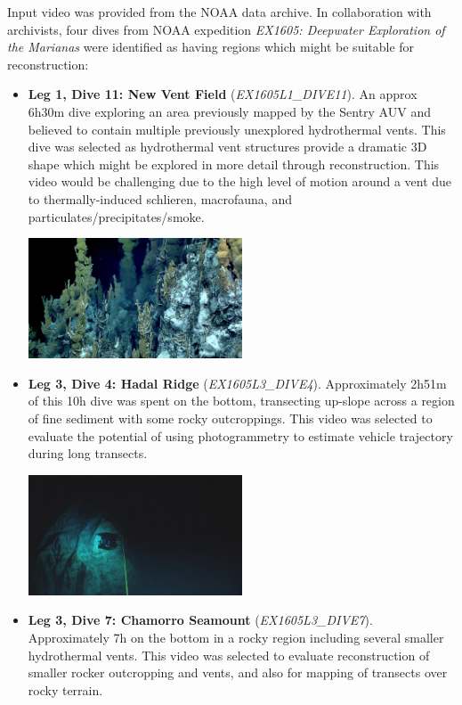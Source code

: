 \documentclass[letterpaper,12pt]{article}
\begin{document}
Input video was provided from the NOAA data archive.  In collaboration with archivists, four dives from NOAA expedition \textit{EX1605: Deepwater Exploration of the Marianas} were identified as having regions which might be suitable for reconstruction:

\begin{itemize}
    \item \textbf{Leg 1, Dive 11: New Vent Field} (\textit{EX1605L1\_DIVE11}).   An approx 6h30m dive exploring an area previously mapped by the Sentry AUV and believed to contain multiple previously unexplored hydrothermal vents. This dive was selected as hydrothermal vent structures provide a dramatic 3D shape which might be explored in more detail through reconstruction.    This video would be challenging due to the high level of motion around a vent due to thermally-induced schlieren, macrofauna, and particulates/precipitates/smoke.
    
    \includegraphics[width=0.5\textwidth]{images/EX1605L1_DIVE11_highlight.jpg}
    
    \item \textbf{Leg 3, Dive 4: Hadal Ridge} (\textit{EX1605L3\_DIVE4}).  Approximately 2h51m of this 10h dive was spent on the bottom, transecting up-slope across a region of fine sediment with some rocky outcroppings.  This video was selected to evaluate the potential of using photogrammetry to estimate vehicle trajectory during long transects.
    
    \includegraphics[width=0.5\textwidth]{images/EX1605L3_DIVE4_highlight.jpg}
    
    \item \textbf{Leg 3, Dive 7: Chamorro Seamount} (\textit{EX1605L3\_DIVE7}).  Approximately 7h on the bottom in a rocky region including several smaller hydrothermal vents.    This video was selected to evaluate reconstruction of smaller rocker outcropping and vents, and also for mapping of transects over rocky terrain.
    

\end{itemize}
\end{document}
